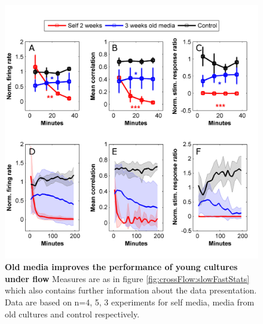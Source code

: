         \begin{figure}[!htb]
            \centering
            \includegraphics[width=15cm]{chapter5/figures/oldOnYoung/oldOnYoung.jpg}
            \caption[Averaged time course of activity measures in young cultures under flow with old media]{\textbf{Old media improves the performance of young cultures under flow} Measures are as in figure \ref{fig:crossFlow:slowFastStats} which also contains further information about the data presentation. Data are based on n=4, 5, 3 experiments for self media, media from old cultures and control respectively.}
            \label{fig:crossFlow:oldOnYoungStats}
        \end{figure}


